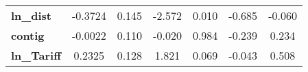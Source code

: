 \begin{center}
\begin{tabular}{lcccccc}
\textbf{ln\_dist}                                                  &      -0.3724  &        0.145     &    -2.572  &         0.010        &       -0.685    &       -0.060     \\
\textbf{contig}                                                    &      -0.0022  &        0.110     &    -0.020  &         0.984        &       -0.239    &        0.234     \\
\textbf{ln\_Tariff}                                                &       0.2325  &        0.128     &     1.821  &         0.069        &       -0.043    &        0.508     \\
\bottomrule
\end{tabular}
\end{center}